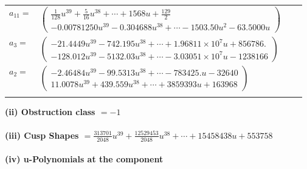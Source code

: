 \documentclass[1p]{elsarticle_modified}
\theoremstyle{definition}
\begin{document}
\begin{tabular}{m{7pt} m{180pt} m{7pt} m{180pt} }
\flushright $a_{11}=$&$\begin{pmatrix}\frac{1}{128} u^{39}+\frac{5}{16} u^{38}+\cdots+1568 u+\frac{129}{2}\\-0.00781250 u^{39}-0.304688 u^{38}+\cdots-1503.50 u^{2}-63.5000 u\end{pmatrix}$ \\
\flushright $a_{3}=$&$\begin{pmatrix}-21.4449 u^{39}-742.195 u^{38}+\cdots+1.96811\times10^{7} u+856786.\\-128.012 u^{39}-5132.03 u^{38}+\cdots-3.03051\times10^{7} u-1238166\end{pmatrix}$ \\
\flushright $a_{2}=$&$\begin{pmatrix}-2.46484 u^{39}-99.5313 u^{38}+\cdots-783425. u-32640\\11.0078 u^{39}+439.559 u^{38}+\cdots+3859393 u+163968\end{pmatrix}$\\&\end{tabular}
\flushleft \textbf{(ii) Obstruction class $= -1$}\\~\\
\flushleft \textbf{(iii) Cusp Shapes $= \frac{313701}{2048} u^{39}+\frac{12529453}{2048} u^{38}+\cdots+15458438 u+553758$}\\~\\
\newpage\renewcommand{\arraystretch}{1}
\flushleft \textbf{(iv) u-Polynomials at the component}\newline \\
\end{document}

